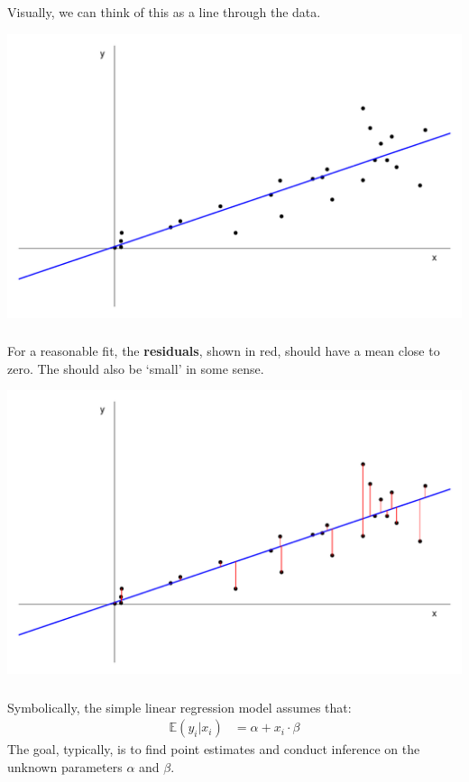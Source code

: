 \begin{frame}[fragile] \frametitle{}

Visually, we can think of this as a line through the data.

\vfill

\includegraphics[width=0.9\linewidth]{img/fig02.pdf}

\end{frame}

\begin{frame}[fragile] \frametitle{}

For a reasonable fit, the {\bf residuals}, shown in red,
should have a mean close to zero. The should also be `small'
in some sense.

\vfill

\includegraphics[width=0.9\linewidth]{img/fig03.pdf}

\end{frame}

\begin{frame}[fragile] \frametitle{}

Symbolically, the simple linear regression model assumes
that:
\begin{align}
\mathbb{E}(y_i|x_i) &= \alpha + x_i \cdot \beta
\end{align}
The goal, typically, is to find point estimates and conduct
inference on the unknown parameters $\alpha$ and $\beta$.

\end{frame}

